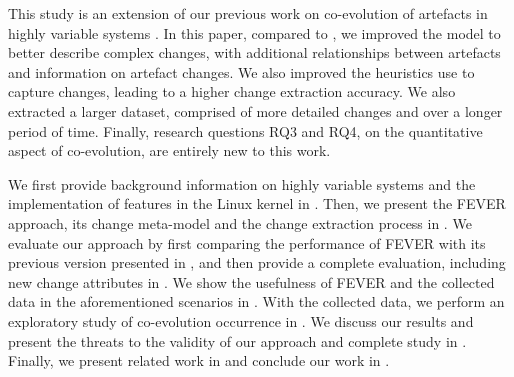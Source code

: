 This study is an extension of our previous work on co-evolution of artefacts in highly variable systems \citep{dintzner_fever:_2016}.
In this paper, compared to \citep{dintzner_fever:_2016},
we improved the model to better describe complex changes, with additional relationships between artefacts and information on artefact changes. 
We also improved the heuristics use to capture changes, leading to a higher change extraction accuracy.
We also extracted a larger dataset, comprised of more detailed changes and over a longer period of time.
Finally, research questions RQ3 and RQ4, on the quantitative aspect of co-evolution, are entirely new
to this work.

We first provide background information on highly variable systems and the implementation of features in the Linux kernel in .
Then, we present the FEVER approach, its change meta-model and the change extraction process in .
We evaluate our approach by first comparing the performance of FEVER with its previous version presented in \citep{dintzner_fever:_2016}, and then
provide a complete evaluation, including new change attributes in .
We show the usefulness of FEVER and the collected data in the aforementioned scenarios in .
With the collected data, we perform an exploratory study of co-evolution occurrence in .
We discuss our results and present the threats to the validity of our approach and complete study in .
Finally, we present related work in  and conclude our work in .
